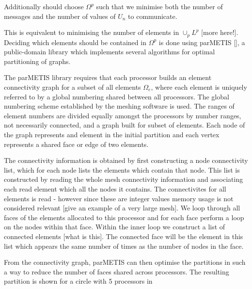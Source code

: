 Additionally should choose $\Omega^p$ such that we minimise both the number of messages and the number of values of $U_{n}$ to communicate.


This is equivalent to minimising the number of elements in $\cup_p L^p$ [more here!]. Deciding which elements should be contained in $\Omega^p$ is done using parMETIS [], a public-domain library which implements several algorithms for optimal partitioning of graphs.

The parMETIS library requires that each processor builds an element connectivity graph for a subset of all elements $\Omega_e$, where each element is uniquely referred to by a global numbering shared between all processors. The global numbering scheme established by the meshing software is used. The ranges of element numbers are divided equally amongst the processors by number ranges, not necessarily connected, and a graph built for subset of elements. Each node of the graph represents and element in the initial partition and each vertex represents a shared face or edge of two elements. 

The connectivity information is obtained by first constructing a node connectivity list, which for each node lists the elements which contain that node. This list is constructed by reading the whole mesh connectivity information and associating each read element which all the nodes it contains. The connectivites for all elements is read - however since these are integer values memory usage is not considered relevant [give an example of a very large mesh]. We loop through all faces of the elements allocated to this processor and for each face perform a loop on the nodes within that face. Within the inner loop we construct a list of connected elements [what is this]. The connected face will be the element in this list which appears the same number of times as the number of nodes in the face.

From the connectivity graph, parMETIS can then optimise the partitions in such a way to reduce the number of faces shared across processors. The resulting partition is shown for a circle with 5 processors in 

